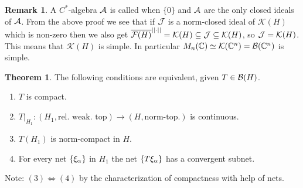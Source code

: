 \documentclass[10pt,english,a4paper]{article}
\theoremstyle{definition}
\newtheorem*{theorem}{Theorem}
\newtheorem*{remark}{Remark}
\let\emph\relax %
\def\Ff{\mathcal{F}}
\def\Kf{\mathcal{K}}
\begin{document}
\begin{remark}
    A $C^*$-algebra $\mathcal{A}$ is called \emph{simple} when $\{0\}$ and $\mathcal{A}$ are
the only closed ideals of $\mathcal{A}$. From the above proof we see that if $\mathcal{J}$ is a
norm-closed ideal of $\Kf(H)$ which is non-zero then we also get
$\ol{\Ff(H)}^{||\cdot||} = \Kf(H) \subseteq \Js \subseteq \Kf(H)$, so $\Js =
\Kf(H)$.
This means that $\Kf(H)$ is simple. In particular $M_n(\C) \simeq \Kf(\C^n) =
\Bs(\C^n)$ is simple.
\end{remark}

\begin{theorem}
    The following conditions are equivalent, given $T \in \mathcal{B}(H)$.
    \begin{enumerate}[(1)]
        \item $T$ is compact.
        \item $T \lvert_{H_1} \colon (H_1, \text{rel. weak. top}) \to (H, \text{norm-top.})$ is 
        continuous.
        \item $T(H_1)$ is norm-compact in $H$. 
        \item For every net $\{\xi_{\alpha}\}$ in $H_1$ the net $\{T\xi_{\alpha}\}$ has 
              a convergent subnet.
    \end{enumerate}
\end{theorem}

Note: $(3) \iff (4)$ by the characterization of compactness with help of nets.
\end{document}
